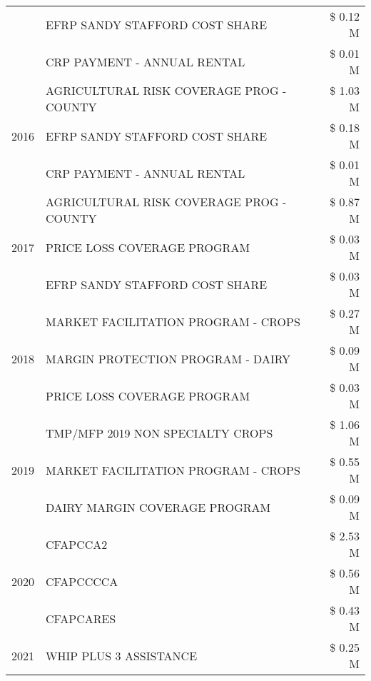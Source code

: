 \begin{tabular}{llr}
 & EFRP SANDY STAFFORD COST SHARE & \$ 0.12 M \\
 & CRP PAYMENT - ANNUAL RENTAL & \$ 0.01 M \\
\cline{1-3}
\multirow[t]{3}{*}{2016} & AGRICULTURAL RISK COVERAGE PROG - COUNTY & \$ 1.03 M \\
 & EFRP SANDY STAFFORD COST SHARE & \$ 0.18 M \\
 & CRP PAYMENT - ANNUAL RENTAL & \$ 0.01 M \\
\cline{1-3}
\multirow[t]{3}{*}{2017} & AGRICULTURAL RISK COVERAGE PROG - COUNTY & \$ 0.87 M \\
 & PRICE LOSS COVERAGE PROGRAM & \$ 0.03 M \\
 & EFRP SANDY STAFFORD COST SHARE & \$ 0.03 M \\
\cline{1-3}
\multirow[t]{3}{*}{2018} & MARKET FACILITATION PROGRAM - CROPS & \$ 0.27 M \\
 & MARGIN PROTECTION PROGRAM - DAIRY & \$ 0.09 M \\
 & PRICE LOSS COVERAGE PROGRAM & \$ 0.03 M \\
\cline{1-3}
\multirow[t]{3}{*}{2019} & TMP/MFP 2019 NON SPECIALTY CROPS & \$ 1.06 M \\
 & MARKET FACILITATION PROGRAM - CROPS & \$ 0.55 M \\
 & DAIRY MARGIN COVERAGE PROGRAM & \$ 0.09 M \\
\cline{1-3}
\multirow[t]{3}{*}{2020} & CFAPCCA2 & \$ 2.53 M \\
 & CFAPCCCCA & \$ 0.56 M \\
 & CFAPCARES & \$ 0.43 M \\
\cline{1-3}
2021 & WHIP PLUS 3 ASSISTANCE & \$ 0.25 M \\
\cline{1-3}
\bottomrule
\end{tabular}
